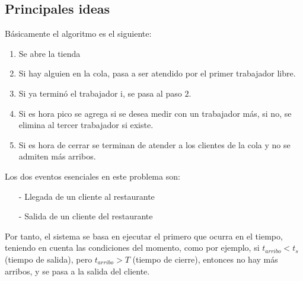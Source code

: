 \documentclass[11pt]{article}
\begin{document}
\subsection{Principales ideas}
B\'asicamente el algoritmo es el siguiente:
\begin{enumerate}
	\item Se abre la tienda
	\item Si hay alguien en la cola, pasa a ser atendido por el primer trabajador libre.
	\item Si ya termin\'o el trabajador i, se pasa al paso $2$.
	\item Si es hora pico se agrega si se desea medir con un trabajador m\'as, si no, se elimina al tercer
	trabajador si existe.
	\item Si es hora de cerrar se terminan de atender a los clientes de la cola y no se admiten m\'as arribos.
\end{enumerate}
Los dos eventos esenciales en este problema son:
\begin{enumerate}
	\item[-] Llegada de un cliente al restaurante
	\item[-] Salida de un cliente del restaurante
\end{enumerate}
Por tanto, el sistema se basa en ejecutar el primero que ocurra en el tiempo, teniendo en cuenta las condiciones 
del momento, como por ejemplo, si $t_{arribo} < t_{s}$(tiempo de salida), pero $t_{arribo} > T$ (tiempo de cierre), entonces no hay m\'as arribos, y se pasa a la salida del cliente.
\end{document}
